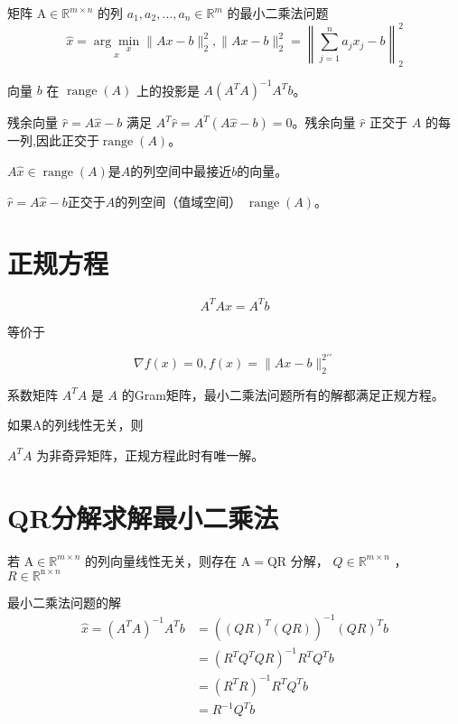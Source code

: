 矩阵 $ \mathrm{A} \in \mathbb{R}^{m \times n} $ 的列 $ a_{1}, a_{2}, \ldots, a_{n} \in \mathbb{R}^{m} $ 的最小二乘法问题
$$
\hat{x}=\underset{x}{\arg \underset{x}{\min}}\|A x-b\|_{2}^{2} ,\|A x-b\|_{2}^{2}=\left\|\sum_{j=1}^{n} a_{j} x_{j}-b\right\|_{2}^{2}
$$

向量 $ b $ 在 $ \operatorname{range}(A) $ 上的投影是 $ A\left(A^{T} A\right)^{-1} A^{T} b $。

残余向量 $ \hat{r}=A \hat{x}-b $ 满足 $ A^{T} \hat{r}=A^{T}(A \hat{x}-b)=0 $。残余向量 $ \hat{r} $ 正交于 $ A $ 的每一列,因此正交于$ \operatorname{range}(A) $。




\begin{theorem}
    $ A \hat{x} \in \operatorname{range}(A) $是$A$的列空间中最接近$b$的向量。 
    
    $ \hat{r}=A \hat{x} -b$正交于$A$的列空间（值域空间） $ \operatorname{range}(A) $。
\end{theorem}

\section{正规方程}

\begin{theorem}[最小二乘法问题的正规方程]
    $$
A^{T} A x=A^{T} b
$$

等价于

$$ \nabla f(x)=0, f(x)=\|A x-b\|_{2}^{2 \prime \prime} $$
\end{theorem}

系数矩阵 $ A^{T} A $ 是 $ A $ 的Gram矩阵，最小二乘法问题所有的解都满足正规方程。

\begin{theorem}
    如果A的列线性无关，则

    $ A^{T} A $ 为非奇异矩阵，正规方程此时有唯一解。
\end{theorem}


\section{QR分解求解最小二乘法}

\begin{theorem}[QR分解求解最小二乘法]
    若 $ \mathrm{A} \in \mathbb{R}^{m \times n} $ 的列向量线性无关，则存在 $ \mathrm{A}=\mathrm{QR} $ 分解， $ Q \in \mathbb{R}^{m \times n} $ ， $ R \in \mathbb{R}^{\mathrm{n} \times n} $ 
    
    最小二乘法问题的解
$$
\begin{aligned}
\hat{x}=\left(A^{T} A\right)^{-1} A^{T} b &=\left((Q R)^{T}(Q R)\right)^{-1}(Q R)^{T} b \\
&=\left(R^{T} Q^{T} Q R\right)^{-1} R^{T} Q^{T} b \\
&=\left(R^{T} R\right)^{-1} R^{T} Q^{T} b \\
&=R^{-1} Q^{T} b
\end{aligned}
$$
\end{theorem}


